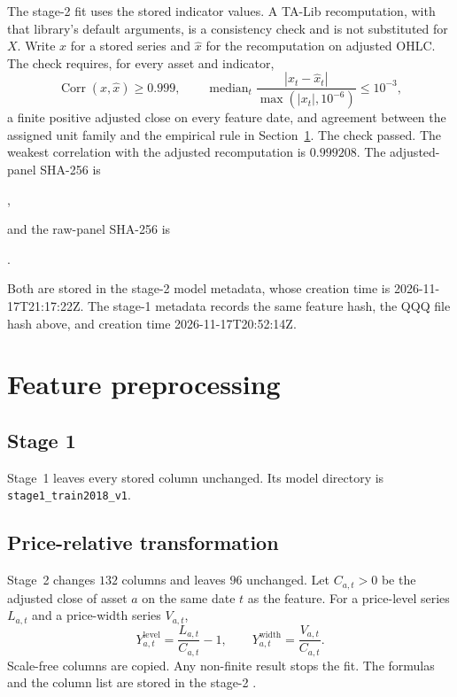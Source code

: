 \documentclass[11pt]{article}
\begin{document}
The stage-2 fit uses the stored indicator values.
A TA-Lib recomputation, with that library's default arguments, is a consistency check and is not substituted for \(X\).
Write \(x\) for a stored series and \(\hat x\) for the recomputation on adjusted OHLC.
The check requires, for every asset and indicator,
\[
\operatorname{Corr}(x,\hat x)\ge 0.999,
\qquad
\operatorname{median}_t\frac{|x_t-\hat x_t|}{\max(|x_t|,10^{-6})}\le 10^{-3},
\]
a finite positive adjusted close on every feature date, and agreement between the assigned unit family and the empirical rule in Section~\ref{sec:transform}.
The check passed.
The weakest correlation with the adjusted recomputation is \(0.999208\).
The adjusted-panel SHA-256 is
\begin{center}
,
\end{center}
and the raw-panel SHA-256 is
\begin{center}
.
\end{center}
Both are stored in the stage-2 model metadata, whose creation time is 2026-11-17T21:17:22Z.
The stage-1 metadata records the same feature hash, the QQQ file hash above, and creation time 2026-11-17T20:52:14Z.

\section{Feature preprocessing}
\label{sec:transform}

\subsection{Stage 1}

Stage~1 leaves every stored column unchanged.
Its model directory is \texttt{stage1\_train2018\_v1}.

\subsection{Price-relative transformation}

Stage~2 changes \(132\) columns and leaves \(96\) unchanged.
Let \(C_{a,t}>0\) be the adjusted close of asset \(a\) on the same date \(t\) as the feature.
For a price-level series \(L_{a,t}\) and a price-width series \(V_{a,t}\),
\begin{equation}
\label{eq:ratios}
Y^{\mathrm{level}}_{a,t}=\frac{L_{a,t}}{C_{a,t}}-1,
\qquad
Y^{\mathrm{width}}_{a,t}=\frac{V_{a,t}}{C_{a,t}}.
\end{equation}
Scale-free columns are copied.
Any non-finite result stops the fit.
The formulas and the column list are stored in the stage-2 .
\end{document}
